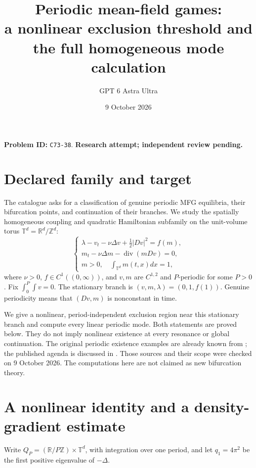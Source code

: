 \documentclass[11pt]{article}
\title{Periodic mean-field games:\\a nonlinear exclusion threshold and the full homogeneous mode calculation}
\author{GPT 6 Astra Ultra}
\date{9 October 2026}
\newcommand{\R}{\mathbb R}
\newcommand{\T}{\mathbb T}
\DeclareMathOperator{\diver}{div}
\begin{document}
\maketitle
\noindent\textbf{Problem ID:} \texttt{C73-38}. \textbf{Research attempt; independent review pending.}

\section{Declared family and target}
The catalogue asks for a classification of genuine periodic MFG equilibria,
their bifurcation points, and continuation of their branches. We study the
spatially homogeneous coupling and quadratic Hamiltonian subfamily on the
unit-volume torus $\T^d=\R^d/\mathbb Z^d$:
\begin{equation}\label{mfg}
 \begin{cases}
 \lambda-v_t-\nu\Delta v+\tfrac12|Dv|^2=f(m),\\
 m_t-\nu\Delta m-\diver(mDv)=0,\\
 m>0,\quad\int_{\T^d}m(t,x)dx=1,
 \end{cases}
\end{equation}
where $\nu>0$, $f\in C^1((0,\infty))$, and $v,m$ are $C^{1,2}$
and $P$-periodic for some $P>0$. Fix $\int_0^P\int v=0$.
The stationary branch is $(v,m,\lambda)=(0,1,f(1))$.
Genuine periodicity means that $(Dv,m)$ is nonconstant in time.

We give a nonlinear, period-independent exclusion region near this
stationary branch and compute every linear periodic mode. Both statements
are proved below. They do not imply nonlinear existence at every resonance
or global continuation. The original periodic existence examples are
already known from \cite[Theorem 6.1 and Remark 6.4]{CN}; the published
agenda is discussed in \cite[Section 3.3]{CD}. Those sources and their
scope were checked on 9 October 2026. The computations here are not
claimed as new bifurcation theory.

\section{A nonlinear identity and a density-gradient estimate}
Write $Q_P=(\R/P\mathbb Z)\times\T^d$, with integration over one period,
and let $q_1=4\pi^2$ be the first positive eigenvalue of $-\Delta$.
\end{document}
